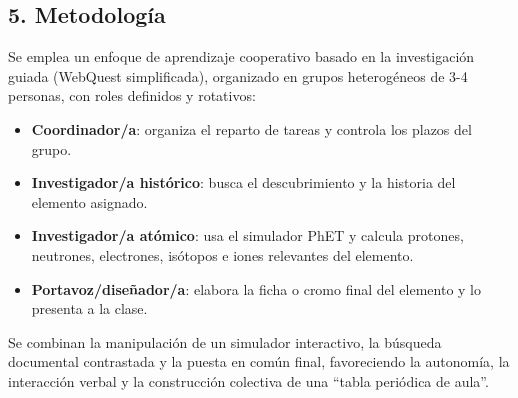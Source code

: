\documentclass[11pt,a4paper]{article}
\begin{document}
\subsection*{5. Metodología}
Se emplea un enfoque de aprendizaje cooperativo basado en la investigación guiada (WebQuest simplificada), organizado en grupos heterogéneos de 3-4 personas, con roles definidos y rotativos:
\begin{itemize}
    \item \textbf{Coordinador/a}: organiza el reparto de tareas y controla los plazos del grupo.
    \item \textbf{Investigador/a histórico}: busca el descubrimiento y la historia del elemento asignado.
    \item \textbf{Investigador/a atómico}: usa el simulador PhET y calcula protones, neutrones, electrones, isótopos e iones relevantes del elemento.
    \item \textbf{Portavoz/diseñador/a}: elabora la ficha o cromo final del elemento y lo presenta a la clase.
\end{itemize}
Se combinan la manipulación de un simulador interactivo, la búsqueda documental contrastada y la puesta en común final, favoreciendo la autonomía, la interacción verbal y la construcción colectiva de una ``tabla periódica de aula''.
\end{document}
